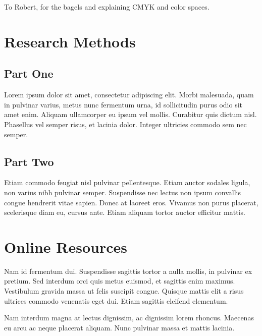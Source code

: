 \documentclass[
acmsmall,
nonacm,
screen,
acmthm]{../templates/acmart}
\begin{document}
To Robert, for the bagels and explaining CMYK and color spaces.

\hypertarget{research-methods}{%
\section{Research Methods}\label{research-methods}}

\hypertarget{part-one}{%
\subsection{Part One}\label{part-one}}

Lorem ipsum dolor sit amet, consectetur adipiscing elit. Morbi
malesuada, quam in pulvinar varius, metus nunc fermentum urna, id
sollicitudin purus odio sit amet enim. Aliquam ullamcorper eu ipsum vel
mollis. Curabitur quis dictum nisl. Phasellus vel semper risus, et
lacinia dolor. Integer ultricies commodo sem nec semper.

\hypertarget{part-two}{%
\subsection{Part Two}\label{part-two}}

Etiam commodo feugiat nisl pulvinar pellentesque. Etiam auctor sodales
ligula, non varius nibh pulvinar semper. Suspendisse nec lectus non
ipsum convallis congue hendrerit vitae sapien. Donec at laoreet eros.
Vivamus non purus placerat, scelerisque diam eu, cursus ante. Etiam
aliquam tortor auctor efficitur mattis.

\hypertarget{online-resources}{%
\section{Online Resources}\label{online-resources}}

Nam id fermentum dui. Suspendisse sagittis tortor a nulla mollis, in
pulvinar ex pretium. Sed interdum orci quis metus euismod, et sagittis
enim maximus. Vestibulum gravida massa ut felis suscipit congue. Quisque
mattis elit a risus ultrices commodo venenatis eget dui. Etiam sagittis
eleifend elementum.

Nam interdum magna at lectus dignissim, ac dignissim lorem rhoncus.
Maecenas eu arcu ac neque placerat aliquam. Nunc pulvinar massa et
mattis lacinia.


\end{document}

